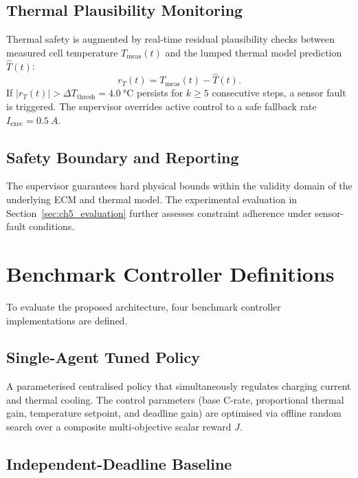 \subsection{Thermal Plausibility Monitoring}
\label{subsec:ch5_thermal_monitor}

Thermal safety is augmented by real-time residual plausibility checks between measured cell temperature $T_{\mathrm{meas}}(t)$ and the lumped thermal model prediction $\hat{T}(t)$:
\begin{equation}
  r_T(t) = T_{\mathrm{meas}}(t) - \hat{T}(t).
\end{equation}
If $|r_T(t)| > \Delta T_{\mathrm{thresh}} = \SI{4.0}{\degreeCelsius}$ persists for $k \ge 5$ consecutive steps, a sensor fault is triggered. The supervisor overrides active control to a safe fallback rate $I_{\mathrm{exec}} = \SI{0.5}{A}$.

\subsection{Safety Boundary and Reporting}
\label{subsec:ch5_safety_boundary}

The supervisor guarantees hard physical bounds within the validity domain of the underlying ECM and thermal model. The experimental evaluation in Section~\ref{sec:ch5_evaluation} further assesses constraint adherence under sensor-fault conditions.

\section{Benchmark Controller Definitions}
\label{sec:ch5_baselines}

To evaluate the proposed architecture, four benchmark controller implementations are defined.

\subsection{Single-Agent Tuned Policy}
\label{subsec:ch5_single_agent}

A parameterised centralised policy that simultaneously regulates charging current and thermal cooling. The control parameters (base C-rate, proportional thermal gain, temperature setpoint, and deadline gain) are optimised via offline random search over a composite multi-objective scalar reward $J$.

\subsection{Independent-Deadline Baseline}
\label{subsec:ch5_independent_baseline}

